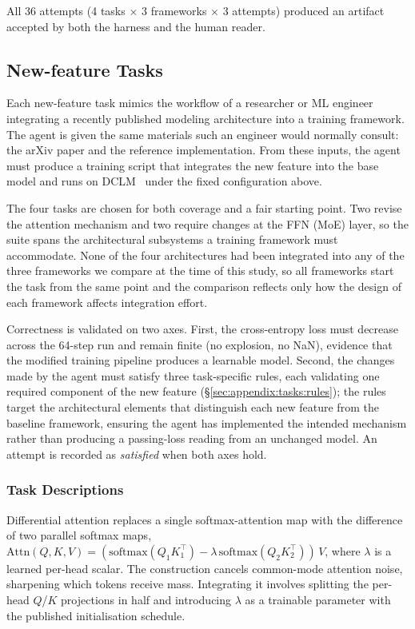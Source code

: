 All 36 attempts (4 tasks $\times$ 3 frameworks $\times$ 3
attempts) produced an artifact accepted by both the harness and
the human reader.

\subsection{New-feature Tasks}
\label{sec:appendix:tasks:new-feature}

Each new-feature task mimics the workflow of a researcher or ML
engineer integrating a recently published modeling architecture
into a training framework. The agent is given the same materials
such an engineer would normally consult: the arXiv paper and the
reference implementation. From these inputs, the agent must
produce a training script that integrates the new feature into the
base model and runs on DCLM~\cite{li2024dclm} under the fixed
configuration above.

The four tasks are chosen for both coverage and a fair
starting point. Two revise the attention mechanism and two require
changes at the FFN (MoE) layer, so the suite spans the architectural
subsystems a training framework must accommodate. None of the four
architectures had been integrated into any of the three frameworks
we compare at the time of this study, so all frameworks start the
task from the same point and the comparison reflects only how the
design of each framework affects integration effort.

Correctness is validated on two axes. First, the cross-entropy loss
must decrease across the 64-step run and remain finite (no explosion,
no NaN), evidence that the modified training pipeline produces a
learnable model. Second, the changes made by the
agent must satisfy three task-specific rules, each validating one
required component of the new feature
(\S\ref{sec:appendix:tasks:rules}); the rules target the
architectural elements that distinguish each new feature from the
baseline framework, ensuring the agent has implemented the intended
mechanism rather than producing a passing-loss reading from an
unchanged model. An attempt is recorded as \emph{satisfied} when both
axes hold.

\subsubsection{Task Descriptions}
\label{sec:appendix:tasks:descriptions}

Differential attention replaces a single softmax-attention map with
the difference of two parallel softmax maps,
$\mathrm{Attn}(Q,K,V) = (\mathrm{softmax}(Q_1 K_1^\top) - \lambda\,
\mathrm{softmax}(Q_2 K_2^\top))\,V$, where $\lambda$ is a learned
per-head scalar. The construction cancels common-mode attention
noise, sharpening which tokens receive mass. Integrating it
involves splitting the per-head $Q$/$K$ projections in half and
introducing $\lambda$ as a trainable parameter with the published
initialisation schedule.

